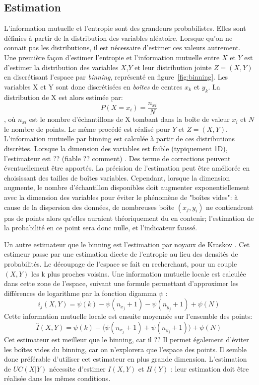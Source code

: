 \subsection{Estimation}
L'information mutuelle et l'entropie sont des grandeurs probabilistes. Elles sont définies à partir de la distribution des variables aléatoire. Lorsque qu'on ne connait pas les distributions, il est nécessaire d'estimer ces valeurs autrement. 
Une première façon d'estimer l'entropie et l'information mutuelle entre $X$ et $Y$ est d'estimer la distribution des variables $X$,$Y$ et leur distribution jointe $Z = (X,Y)$ en discrétisant l'espace par \emph{binning}, représenté en figure~\ref{fig:binning}. Les variables X et Y sont donc discrétisées en \emph{boîtes} de centres $x_k$ et $y_k$. La distribution de X est alors estimée par: 
$$P(X = x_i) = \frac{n_{xi}}{N} $$, où $n_{xi}$ est le nombre d'échantillons de X tombant dans la boîte de valeur $x_i$ et $N$ le nombre de points. Le même procédé est réalisé pour $Y$ et $Z = (X,Y)$.
L'information mutuelle par binning est calculée à partir de ces distributions discrètes.
Lorsque la dimension des variables est faible (typiquement 1D), l'estimateur est ?? (fiable ?? comment) . Des terme de corrections peuvent éventuellement être apportés. La précision de l'estimation peut être améliorée en choisissant des tailles de boîtes variables. Cependant, lorsque la dimension augmente, le nombre d'échantillon disponibles doit augmenter exponentiellement avec la dimension des variables pour éviter le phénomène de "boîtes vides": à cause de la dispersion des données, de nombreuses boîte $(x_j,y_i)$ ne contiendront pas de points alors qu'elles auraient théoriquement du en contenir; l'estimation de la probabilité en ce point sera donc nulle, et l'indicateur faussé. 

Un autre estimateur que le binning est l'estimation par noyaux de Kraskov \cite{2004kraskov}. Cet estimeur passe par une estimation diecte de l'entropie au lieu des densités de probabilités. Le découpage de l'espace se fait en recherchant, pour un couple $(X,Y)$ les k plus proches voisins. Une information mutuelle locale est calculée dans cette zone de l'espace, suivant une formule permettant d'approximer les différences de logarithme par la fonction digamma $\psi$ : 
$$i_j(X,Y) = \psi(k) - \psi(n_{x_j} + 1) - \psi(n_{y_j} +1) + \psi(N)$$
Cette information mutuelle locale est ensuite moyennée sur l'ensemble des points: 
$$\hat{I}(X,Y) = \psi(k) - \langle\psi(n_{x_j} + 1) + \psi(n_{y_j} +1)\rangle + \psi(N)$$
Cet estimateur est meilleur que le binning, car il ?? 
Il permet également d'éviter les boîtes vides du binning, car on n'explorera que l'espace des points. Il semble donc préférable d'utiliser cet estimateur en plus grande dimension.
L'estimation de $UC(X|Y)$ nécessite d'estimer $I(X,Y)$ et $H(Y)$ : leur estimation doit être réalisée dans les mêmes conditions.

